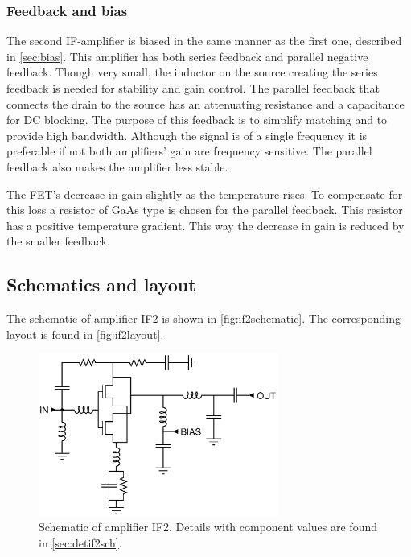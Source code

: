 			\subsubsection{Feedback and bias}
				The second IF-amplifier is biased in the same manner as the first one, described in \autoref{sec:bias}. This amplifier has both series feedback and parallel negative feedback. Though very small, the inductor on the source creating the series feedback is needed for stability and gain control. The parallel feedback that connects the drain to the source has an attenuating resistance and a capacitance for DC blocking. The purpose of this feedback is to simplify matching and to provide high bandwidth. Although the signal is of a single frequency it is preferable if not both amplifiers' gain are frequency sensitive. The parallel feedback also makes the amplifier less stable.
				
				The FET's decrease in gain slightly as the temperature rises. To compensate for this loss a resistor of GaAs type is chosen for the parallel feedback. This resistor has a positive temperature gradient. This way the decrease in gain is reduced by the smaller feedback.

		\subsection{Schematics and layout}
			The schematic of amplifier IF2 is shown in \autoref{fig:if2schematic}. The corresponding layout is found in \autoref{fig:if2layout}.
			
			\begin{figure}[hbt!]
				\centering
				\includegraphics[width=0.7\textwidth]{fig/amplifiers/if2/sch_if2}
				\caption[Amplifier IF2 schematic.]{Schematic of amplifier IF2. Details with component values are found in \autoref{sec:detif2sch}.}\label{fig:if2schematic}
			\end{figure}

